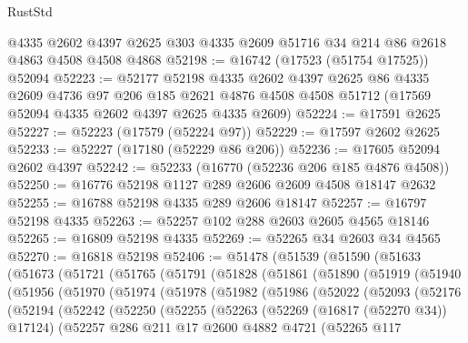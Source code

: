 \begin{lexlean}{RustStd}
\begin{coremodule}
{\begin{coremodule}
{{{{{{{{{{{{{{{{{{{{{{{{{{{{{{{{{{{{{{{{{{{{{{{{{{{{{{{    @4335
    @2602
    @4397
    @2625
    @303
    @4335
    @2609
    @51716
    @34
    @214
    @86
    @2618
    @4863
    @4508
    @4508
    @4868
@52198 := @16742 (@17523 (@51754 @17525)) @52094
@52223 := @52177
    @52198
    @4335
    @2602
    @4397
    @2625
    @86
    @4335
    @2609
    @4736
    @97
    @206
    @185
    @2621
    @4876
    @4508
    @4508
    @51712
    (@17569 @52094 @4335 @2602 @4397 @2625 @4335 @2609)
@52224 := @17591 @2625
@52227 := @52223 (@17579 (@52224 @97))
@52229 := @17597 @2602 @2625
@52233 := @52227 (@17180 (@52229 @86 @206))
@52236 := @17605 @52094 @2602 @4397
@52242 := @52233 (@16770 (@52236 @206 @185 @4876 @4508))
@52250 := @16776 @52198 @1127 @289 @2606 @2609 @4508 @18147 @2632
@52255 := @16788 @52198 @4335 @289 @2606 @18147
@52257 := @16797 @52198 @4335
@52263 := @52257 @102 @288 @2603 @2605 @4565 @18146
@52265 := @16809 @52198 @4335
@52269 := @52265 @34 @2603 @34 @4565
@52270 := @16818 @52198
@52406 := @51478
    (@51539
      (@51590
        (@51633
          (@51673
            (@51721
              (@51765
                (@51791
                  (@51828
                    (@51861
                      (@51890
                        (@51919
                          (@51940
                            (@51956
                              (@51970
                                (@51974
                                  (@51978
                                    (@51982
                                      (@51986
                                        (@52022
                                          (@52093
                                            (@52176
                                              (@52194
                                                (@52242
                                                  (@52250
                                                    (@52255
                                                      (@52263
                                                        (@52269 (@16817 (@52270 @34)) @17124)
                                                        (@52257
                                                          @286
                                                          @211
                                                          @17
                                                          @2600
                                                          @4882
                                                          @4721
                                                          (@52265
                                                            @117
}}}}}}}}}}}}}}}}}}}}}}}}}}}}}}}}}}}}}}}}}}}}}}}}}}}}}}}
\end{coremodule}}
\end{coremodule}
\end{lexlean}
